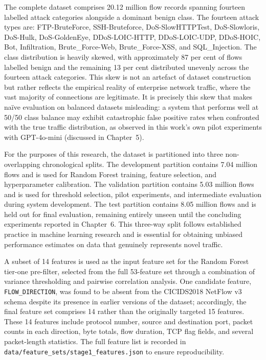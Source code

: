The complete dataset comprises 20.12 million flow records spanning fourteen labelled attack categories alongside a dominant benign class. The fourteen attack types are: FTP-BruteForce, SSH-Bruteforce, DoS-SlowHTTPTest, DoS-Slowloris, DoS-Hulk, DoS-GoldenEye, DDoS-LOIC-HTTP, DDoS-LOIC-UDP, DDoS-HOIC, Bot, Infiltration, Brute\_Force-Web, Brute\_Force-XSS, and SQL\_Injection. The class distribution is heavily skewed, with approximately 87 per cent of flows labelled benign and the remaining 13 per cent distributed unevenly across the fourteen attack categories. This skew is not an artefact of dataset construction but rather reflects the empirical reality of enterprise network traffic, where the vast majority of connections are legitimate. It is precisely this skew that makes na\"{i}ve evaluation on balanced datasets misleading: a system that performs well at 50/50 class balance may exhibit catastrophic false positive rates when confronted with the true traffic distribution, as observed in this work's own pilot experiments with GPT-4o-mini (discussed in Chapter~5).

For the purposes of this research, the dataset is partitioned into three non-overlapping chronological splits. The development partition contains 7.04 million flows and is used for Random Forest training, feature selection, and hyperparameter calibration. The validation partition contains 5.03 million flows and is used for threshold selection, pilot experiments, and intermediate evaluation during system development. The test partition contains 8.05 million flows and is held out for final evaluation, remaining entirely unseen until the concluding experiments reported in Chapter~6. This three-way split follows established practice in machine learning research \autocite{Cawley2010} and is essential for obtaining unbiased performance estimates on data that genuinely represents novel traffic.

A subset of 14 features is used as the input feature set for the Random Forest tier-one pre-filter, selected from the full 53-feature set through a combination of variance thresholding and pairwise correlation analysis. One candidate feature, \texttt{FLOW\_DIRECTION}, was found to be absent from the CICIDS2018 NetFlow v3 schema despite its presence in earlier versions of the dataset; accordingly, the final feature set comprises 14 rather than the originally targeted 15 features. These 14 features include protocol number, source and destination port, packet counts in each direction, byte totals, flow duration, TCP flag fields, and several packet-length statistics. The full feature list is recorded in \texttt{data/feature\_sets/stage1\_features.json} to ensure reproducibility.

